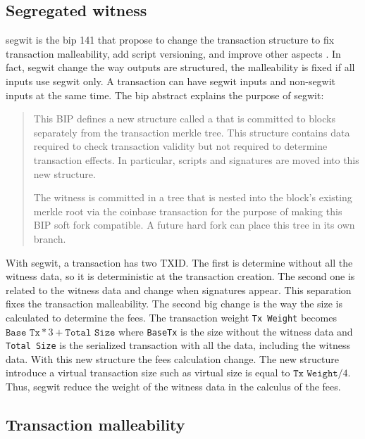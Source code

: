 \subsection{Segregated witness}

\gls{segwit} is the \gls{bip} 141 that propose to change the transaction
structure to fix transaction malleability, add script versioning, and improve
other aspects \cite{SegWit, SegWitBIP}. In fact, \gls{segwit} change the way
outputs are structured, the malleability is fixed if all inputs use \gls{segwit}
only. A transaction can have \gls{segwit} inputs and non-\gls{segwit} inputs at
the same time. The \gls{bip} abstract explains the purpose of \gls{segwit}:

\begin{quote}
  This BIP defines a new structure called a  that is committed to
  blocks separately from the transaction merkle tree. This structure contains
  data required to check transaction validity but not required to determine
  transaction effects. In particular, scripts and signatures are moved into this
  new structure.

  The witness is committed in a tree that is nested into the block's existing
  merkle root via the coinbase transaction for the purpose of making this BIP
  soft fork compatible. A future hard fork can place this tree in its own branch.
\end{quote}

With \gls{segwit}, a transaction has two TXID. The first is determine without
all the witness data, so it is deterministic at the transaction creation. The
second one is related to the witness data and change when signatures appear.
This separation fixes the transaction malleability. The second big change is the
way the size is calculated to determine the fees. The transaction weight
\texttt{Tx Weight} becomes $\texttt{Base Tx} * 3 + \texttt{Total Size}$ where
\texttt{BaseTx} is the size without the witness data and \texttt{Total Size} is
the serialized transaction with all the data, including the witness data. With
this new structure the fees calculation change. The new structure introduce a
virtual transaction size such as virtual size is equal to $\texttt{Tx Weight} /
4$. Thus, \gls{segwit} reduce the weight of the witness data in the calculus of
the fees.

\subsection{Transaction malleability}

